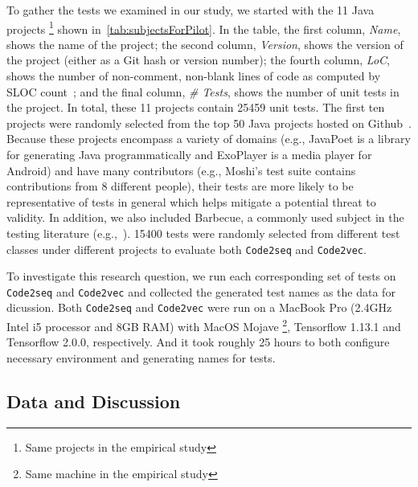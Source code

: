 \begin{appendices}
To gather the tests we examined in our study, we started with the \num{11} Java projects \footnote{Same projects in the empirical study} shown in~\cref{tab:subjectsForPilot}.
%
In the table, the first column, \emph{Name}, shows the name of the project; the second column, \emph{Version}, shows the version of the project (either as a Git hash or version number); the fourth column, \emph{LoC}, shows the number of non-comment, non-blank lines of code as computed by SLOC count~\cite{nguyen2007sloc}; and the final column, \emph{\# Tests}, shows the number of unit tests in the project. In total, these \num{11} projects contain \num{25459} unit tests.
%
The first ten projects were randomly selected from the top \num{50} Java projects hosted on Github~\cite{top50projects}.
%
Because these projects encompass a variety of domains (e.g., JavaPoet is a library for generating Java programmatically and ExoPlayer is a media player for Android) and have many contributors (e.g., Moshi’s test suite contains contributions from \num{8} different people), their tests are more likely to be representative of tests in general which helps mitigate a potential threat to validity.
%
In addition, we also included Barbecue, a commonly used subject in the testing literature (e.g.,~\cite{zhang2015automatically, zhang2016towards,wu2020pattern}).
%
\num{15400} tests were randomly selected from different test classes under different projects to evaluate both \texttt{Code2seq} and \texttt{Code2vec}.


To investigate this research question, we run each corresponding set of tests on \texttt{Code2seq} and \texttt{Code2vec} and collected the generated test names as the data for dicussion.
%
Both \texttt{Code2seq} and \texttt{Code2vec} were run on a MacBook Pro (2.4GHz Intel i5 processor and 8GB RAM) with MacOS Mojave \footnote{Same machine in the empirical study}, Tensorflow 1.13.1 and Tensorflow 2.0.0, respectively.
%
And it took roughly \num{25} hours to both configure necessary environment and generating names for tests.


\subsection{Data and Discussion}



\end{appendices}
